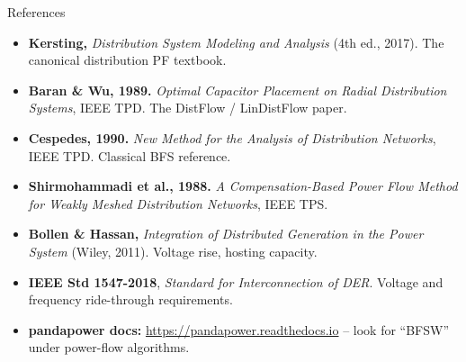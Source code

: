 \documentclass[aspectratio=169,10pt]{beamer}
\begin{document}
\begin{frame}{References}
\footnotesize
\begin{itemize}
  \item \textbf{Kersting,} \emph{Distribution System Modeling and Analysis} (4th ed., 2017). The canonical distribution PF textbook.
  \item \textbf{Baran \& Wu, 1989.} \emph{Optimal Capacitor Placement on Radial Distribution Systems}, IEEE TPD. The DistFlow / LinDistFlow paper.
  \item \textbf{Cespedes, 1990.} \emph{New Method for the Analysis of Distribution Networks}, IEEE TPD. Classical BFS reference.
  \item \textbf{Shirmohammadi et al., 1988.} \emph{A Compensation-Based Power Flow Method for Weakly Meshed Distribution Networks}, IEEE TPS.
  \item \textbf{Bollen \& Hassan,} \emph{Integration of Distributed Generation in the Power System} (Wiley, 2011). Voltage rise, hosting capacity.
  \item \textbf{IEEE Std 1547-2018}, \emph{Standard for Interconnection of DER}. Voltage and frequency ride-through requirements.
  \item \textbf{pandapower docs:} \url{https://pandapower.readthedocs.io} -- look for ``BFSW'' under power-flow algorithms.
\end{itemize}
\end{frame}
\end{document}
